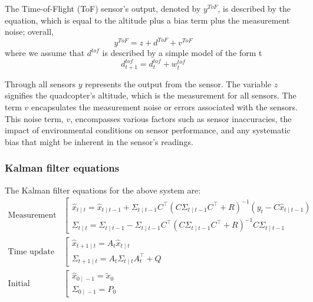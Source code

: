 \documentclass{article}
\begin{document}
    The Time-of-Flight (ToF) sensor's output, denoted by \( y^{ToF} \), is
    described by the equation, which is equal to the altitude plus a bias term
    plus the measurement noise; overall,
    \begin{equation}
    y^{ToF} = z + d^{ToF} + v^{ToF}
    \end{equation}
    where we assume that \(d^{tof}\) is described by a simple model of the form
    t
    \begin{equation}
    d^{tof}_{t+1} = d^{tof}_t + w^{tof}_t
    \end{equation}

    Through all sensors \( y \) represents the output from the sensor. The
    variable \( z \) signifies the quadcopter's altitude, which is the
    measurement for all sensors. The term \( v \) encapsulates the measurement
    noise or errors associated with the sensors. This noise term, \( v \),
    encompasses various factors such as sensor inaccuracies, the impact of
    environmental conditions on sensor performance, and any systematic bias that
    might be inherent in the sensor's readings.



\subsubsection*{Kalman filter equations}
The Kalman filter equations for the above system are:
\begin{align}
    \text{Measurement} &
    \left[
    \begin{array}{l}
      \hat{x}_{t{}\mid{}t}
      {}={}
      \hat{x}_{t{}\mid{}t-1}
      {}+{}
      \Sigma_{t{}\mid{}t-1}C^\intercal
      (C\Sigma_{t{}\mid{}t-1}C^\intercal + R)^{-1}(y_t - C\hat{x}_{t{}\mid{}t-1})
      \\
      \Sigma_{t{}\mid{}t}
      {}={}
      \Sigma_{t{}\mid{}t-1}
      {}-{}
      \Sigma_{t{}\mid{}t-1}C^\intercal
      (C\Sigma_{t{}\mid{}t-1}C^\intercal + R)^{-1}
      C\Sigma_{t{}\mid{}t-1}
    \end{array}
    \right.
    \\
    \text{Time update}        &
    \left[
    \begin{array}{l}
      \hat{x}_{t+1{}\mid{}t}
      {}={}
      A_t \hat{x}_{t{}\mid{}t}
      \\
      \Sigma_{t+1{}\mid{}t}
      {}={}
      A_t \Sigma_{t{}\mid{}t} A_t^\intercal + Q
    \end{array}
    \right.
    \\
    \text{Initial conditions} &
    \left[
    \begin{array}{l}
      \hat{x}_{0{}\mid{}-1}
      {}={}
      \tilde{x}_0
      \\
      \Sigma_{0{}\mid{}-1}
      {}={}
      P_0
    \end{array}
    \right.
  \end{align}
\end{document}
